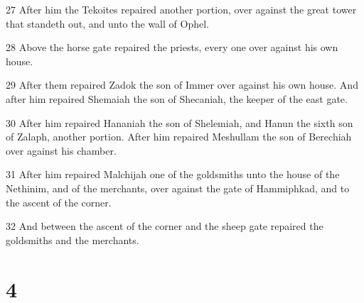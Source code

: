 \par 27 After him the Tekoites repaired another portion, over against the great tower that standeth out, and unto the wall of Ophel.
\par 28 Above the horse gate repaired the priests, every one over against his own house.
\par 29 After them repaired Zadok the son of Immer over against his own house. And after him repaired Shemaiah the son of Shecaniah, the keeper of the east gate.
\par 30 After him repaired Hananiah the son of Shelemiah, and Hanun the sixth son of Zalaph, another portion. After him repaired Meshullam the son of Berechiah over against his chamber.
\par 31 After him repaired Malchijah one of the goldsmiths unto the house of the Nethinim, and of the merchants, over against the gate of Hammiphkad, and to the ascent of the corner.
\par 32 And between the ascent of the corner and the sheep gate repaired the goldsmiths and the merchants.

\chapter{4}

